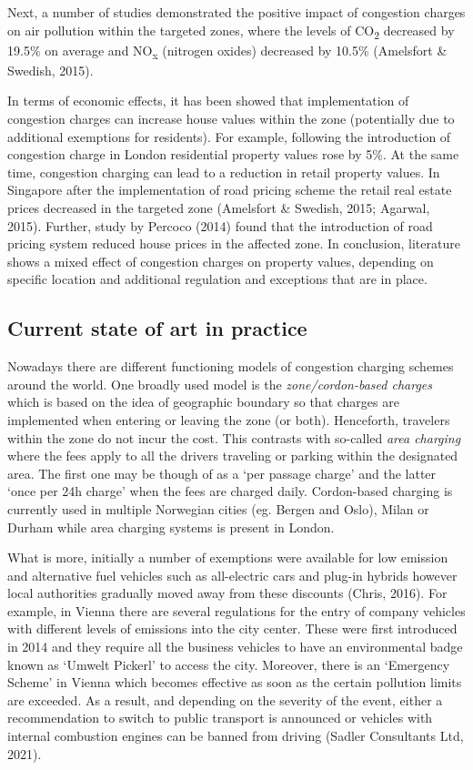 \documentclass[
]{book}
\begin{document}
Next, a number of studies demonstrated the positive impact of congestion charges on air pollution within the targeted zones, where the levels of CO\textsubscript{2} decreased by 19.5\% on average and NO\textsubscript{x} (nitrogen oxides) decreased by 10.5\% (Amelsfort \& Swedish, 2015).

In terms of economic effects, it has been showed that implementation of congestion charges can increase house values within the zone (potentially due to additional exemptions for residents). For example, following the introduction of congestion charge in London residential property values rose by 5\%. At the same time, congestion charging can lead to a reduction in retail property values. In Singapore after the implementation of road pricing scheme the retail real estate prices decreased in the targeted zone (Amelsfort \& Swedish, 2015; Agarwal, 2015). Further, study by Percoco (2014) found that the introduction of road pricing system reduced house prices in the affected zone. In conclusion, literature shows a mixed effect of congestion charges on property values, depending on specific location and additional regulation and exceptions that are in place.

\hypertarget{current-state-of-art-in-practice-4}{%
\subsection*{Current state of art in practice}\label{current-state-of-art-in-practice-4}}

Nowadays there are different functioning models of congestion charging schemes around the world. One broadly used model is the \emph{zone/cordon-based charges} which is based on the idea of geographic boundary so that charges are implemented when entering or leaving the zone (or both). Henceforth, travelers within the zone do not incur the cost. This contrasts with so-called \emph{area charging} where the fees apply to all the drivers traveling or parking within the designated area. The first one may be though of as a `per passage charge' and the latter `once per 24h charge' when the fees are charged daily. Cordon-based charging is currently used in multiple Norwegian cities (eg. Bergen and Oslo), Milan or Durham while area charging systems is present in London.

What is more, initially a number of exemptions were available for low emission and alternative fuel vehicles such as all-electric cars and plug-in hybrids however local authorities gradually moved away from these discounts (Chris, 2016). For example, in Vienna there are several regulations for the entry of company vehicles with different levels of emissions into the city center. These were first introduced in 2014 and they require all the business vehicles to have an environmental badge known as `Umwelt Pickerl' to access the city. Moreover, there is an `Emergency Scheme' in Vienna which becomes effective as soon as the certain pollution limits are exceeded. As a result, and depending on the severity of the event, either a recommendation to switch to public transport is announced or vehicles with internal combustion engines can be banned from driving (Sadler Consultants Ltd, 2021).
\end{document}
